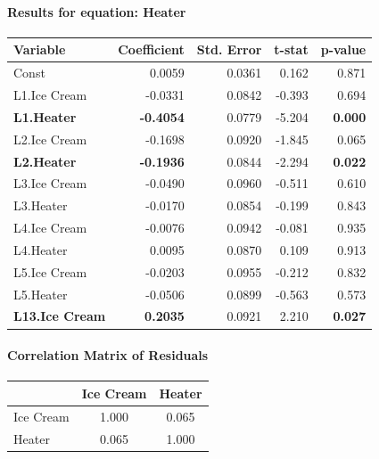 \documentclass[10pt,a4paper]{article}
\begin{document}
	\paragraph{Results for equation: Heater}
	\begin{center}
	\begin{tabular}{lrrrr}
	\toprule
	Variable & Coefficient & Std. Error & t-stat & p-value \\
	\midrule
	Const & 0.0059 & 0.0361 & 0.162 & 0.871 \\
	
	L1.Ice Cream & -0.0331 & 0.0842 & -0.393 & 0.694 \\
	\textbf{\color{red}L1.Heater} & \textbf{\color{red}-0.4054} & 0.0779 & -5.204 & \textbf{\color{red}0.000} \\
	
	L2.Ice Cream & -0.1698 & 0.0920 & -1.845 & 0.065 \\
	\textbf{\color{red}L2.Heater} & \textbf{\color{red}-0.1936} & 0.0844 & -2.294 & \textbf{\color{red}0.022} \\
	
	L3.Ice Cream & -0.0490 & 0.0960 & -0.511 & 0.610 \\
	L3.Heater & -0.0170 & 0.0854 & -0.199 & 0.843 \\
	
	L4.Ice Cream & -0.0076 & 0.0942 & -0.081 & 0.935 \\
	L4.Heater & 0.0095 & 0.0870 & 0.109 & 0.913 \\
	
	L5.Ice Cream & -0.0203 & 0.0955 & -0.212 & 0.832 \\
	L5.Heater & -0.0506 & 0.0899 & -0.563 & 0.573 \\
	
	\textbf{\color{red}L13.Ice Cream} & \textbf{\color{red}0.2035} & 0.0921 & 2.210 & \textbf{\color{red}0.027} \\
	
	\bottomrule
	\end{tabular}
	\end{center}
	
	
	\paragraph{Correlation Matrix of Residuals}
	
	\begin{center}
	\begin{tabular}{lcc}
	\toprule
	 & Ice Cream & Heater \\
	\midrule
	Ice Cream & 1.000 & 0.065 \\
	Heater    & 0.065 & 1.000 \\
	\bottomrule
	\end{tabular}
	\end{center}
	
\end{document}
